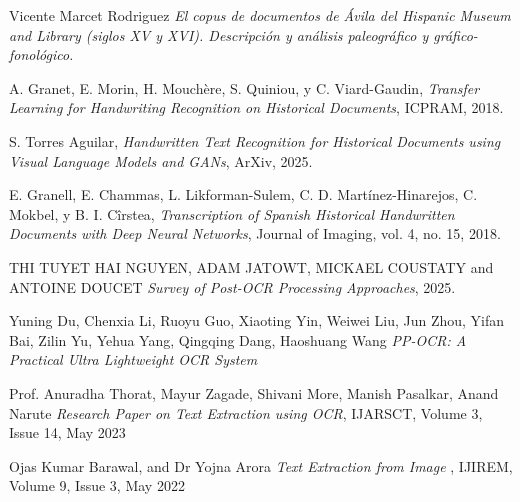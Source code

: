 \documentclass[11pt,a4paper]{article}
\begin{document}
 


\begin{thebibliography}{9}

    Vicente Marcet Rodriguez
    \textit{El copus de documentos de \'Avila del Hispanic Museum and Library (siglos XV y XVI). Descripci\'on y an\'alisis paleogr\'afico y gr\'afico-fonol\'ogico.}

    A. Granet, E. Morin, H. Mouchère, S. Quiniou, y C. Viard-Gaudin, 
    \textit{Transfer Learning for Handwriting Recognition on Historical Documents}, 
    ICPRAM, 2018.
    
    S. Torres Aguilar, 
    \textit{Handwritten Text Recognition for Historical Documents using Visual Language Models and GANs}, 
    ArXiv, 2025.
    
    E. Granell, E. Chammas, L. Likforman-Sulem, C. D. Martínez-Hinarejos, C. Mokbel, y B. I. Cîrstea, 
    \textit{Transcription of Spanish Historical Handwritten Documents with Deep Neural Networks}, 
    Journal of Imaging, vol. 4, no. 15, 2018.
    
    THI TUYET HAI NGUYEN, ADAM JATOWT, MICKAEL COUSTATY and ANTOINE DOUCET
    \textit{Survey of Post-OCR Processing Approaches}, 
    2025.

    Yuning Du, Chenxia Li, Ruoyu Guo, Xiaoting Yin, Weiwei Liu,
Jun Zhou, Yifan Bai, Zilin Yu, Yehua Yang, Qingqing Dang, Haoshuang Wang
    \textit{PP-OCR: A Practical Ultra Lightweight OCR System}
    
    Prof. Anuradha Thorat, Mayur Zagade, Shivani More, Manish Pasalkar, Anand Narute
    \textit{Research Paper on Text Extraction using OCR}, 
    IJARSCT, Volume 3, Issue 14, May 2023

    Ojas Kumar Barawal, and Dr Yojna Arora
    \textit{Text Extraction from Image }, 
    IJIREM, Volume 9, Issue 3, May 2022

\end{thebibliography}
\end{document}
